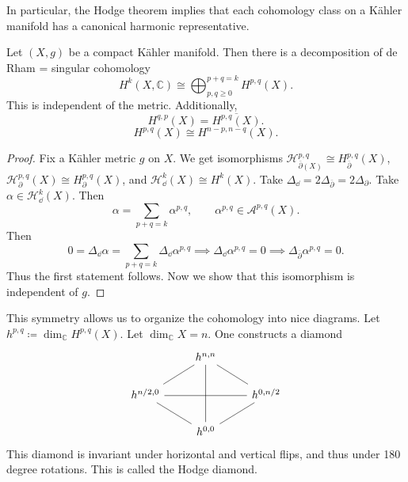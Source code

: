 In particular, the Hodge theorem implies that each cohomology class on a K\"ahler manifold has a canonical harmonic representative.

\begin{theorem}\label{thm:awoooooooooo}
	Let $(X,g)$ be a compact K\"ahler manifold. Then there is a decomposition of de Rham = singular cohomology
	\[
		H^k(X,\mathbb{C} ) \cong \bigoplus_{p,q\geq 0}^{p+q=k} H^{p,q} (X)
	.\]
	This is independent of the metric. Additionally,
	\[
		H^{q,p} (X) = \overline{H^{p,q} (X)} 
	.\]
	\[
		H^{p,q} (X) \cong H^{n-p,n-q} (X)
	.\]
\end{theorem}
\begin{proof}
	Fix a K\"ahler metric $g$ on $X$. We get isomorphisms $\mathcal{H} ^{p,q}_{\overline{\partial } (X)} \cong H^{p,q}_{\overline{\partial } } (X)$, $\mathcal{H} ^{p,q}_{\partial } (X) \cong H^{p,q}_{\partial } (X)$, and $\mathcal{H} ^{k}_{\dd } (X) \cong H^k(X)$. Take $\Delta _{\dd } =2 \Delta _{\overline{\partial } } =2\Delta _{\partial } $. Take $\alpha \in \mathcal{H} ^k_{\dd } (X)$. Then
	\[
		\alpha =\sum_{p+q=k} \alpha ^{p,q} ,\qquad \alpha ^{p,q} \in \mathcal{A} ^{p,q} (X)
	.\]
	Then
	\[
		0=\Delta _{\dd } \alpha =\sum_{p+q=k} \Delta _{\dd } \alpha ^{p,q} \implies \Delta _{\dd } \alpha ^{p,q} =0 \implies \Delta _{\overline{\partial }} \alpha ^{p,q} =0
	.\]
	Thus the first statement follows. Now we show that this isomorphism is independent of $g$.
\end{proof}

This symmetry allows us to organize the cohomology into nice diagrams. Let $h^{p,q} \coloneqq \dim_\mathbb{C} H^{p,q} (X)$. Let $\dim_\mathbb{C} X=n$. One constructs a diamond
\[\begin{tikzcd}
	& {h^{n,n}} & \\
	{h^{n/2,0}} && {h^{0,n/2}} \\
	& {h^{0,0}}
	\arrow[no head, from=2-1, to=1-2]
	\arrow[no head, from=2-3, to=1-2]
	\arrow[no head, from=2-3, to=2-1]
	\arrow[no head, from=3-2, to=1-2]
	\arrow[no head, from=3-2, to=2-1]
	\arrow[no head, from=3-2, to=2-3]
\end{tikzcd}\]
This diamond is invariant under horizontal and vertical flips, and thus under 180 degree rotations. This is called the Hodge diamond.
